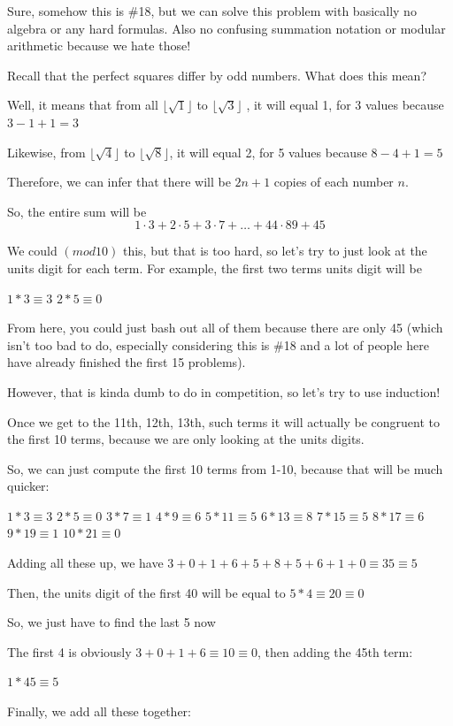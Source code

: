 \begin{enumerate}
Sure, somehow this is \#18, but we can solve this problem with basically no algebra or any hard formulas. Also no confusing summation notation or modular arithmetic because we hate those! 

 Recall that the perfect squares differ by odd numbers. What does this mean?

 Well, it means that from all $\lfloor \sqrt{1} \rfloor$ to $\lfloor \sqrt{3} \rfloor$ , it will equal 1, for 3 values because $3-1+1=3$

 Likewise, from $\lfloor \sqrt{4} \rfloor$ to $\lfloor \sqrt{8} \rfloor$, it will equal 2, for 5 values because $8-4+1=5$

 Therefore, we can infer that there will be $2n+1$ copies of each number $n$. 

 So, the entire sum will be 
 \[1 \cdot 3 + 2 \cdot 5 + 3 \cdot 7 + \dots + 44 \cdot 89 + 45\]

 We could $(mod 10)$ this, but that is too hard, so let's try to just look at the units digit for each term. For example, the first two terms units digit will be 

 $1*3\equiv3$
$2*5\equiv0$

 From here, you could just bash out all of them because there are only 45 (which isn't too bad to do, especially considering this is \#18 and a lot of people here have already finished the first 15 problems). 

 However, that is kinda dumb to do in competition, so let's try to use induction!

 Once we get to the 11th, 12th, 13th, such terms it will actually be congruent to the first 10 terms, because we are only looking at the units digits. 

 So, we can just compute the first 10 terms from 1-10, because that will be much quicker:

 $1*3\equiv3$
$2*5\equiv0$
$3*7\equiv1$
$4*9\equiv6$
$5*11\equiv5$
$6*13\equiv8$
$7*15\equiv5$
$8*17\equiv6$
$9*19\equiv1$
$10*21\equiv0$

 Adding all these up, we have $3+0+1+6+5+8+5+6+1+0\equiv35\equiv5$

 Then, the units digit of the first 40 will be equal to $5*4\equiv20\equiv0$

 So, we just have to find the last 5 now

 The first 4 is obviously $3+0+1+6\equiv10\equiv0$, then adding the 45th term:

 $1*45\equiv5$

 Finally, we add all these together:


\end{enumerate}
